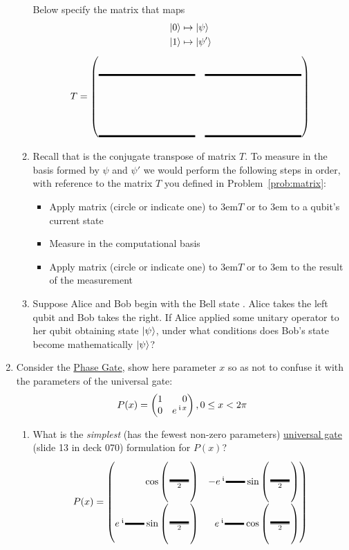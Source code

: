 \documentclass[12pt]{article}
\begin{document}
\begin{enumerate}
\begin{enumerate}[label=\theenumi.\arabic*]
Below specify the matrix that maps
\begin{align*}
    \ket{0} &\mapsto \ket{\psi} \\
    \ket{1} &\mapsto \ket{\psi'}
\end{align*}
\[
T = \begin{pmatrix*}[r]
\Blank[10em]{} & \Blank[10em]{} \\[4em]
\Blank[10em]{} & \Blank[10em]{}
\end{pmatrix*}
\]
\item{} Recall that  is the conjugate transpose of matrix $T$.  To measure in the basis formed by $\psi$ and $\psi'$ we would perform the following steps in order, with reference to the matrix $T$ you defined in Problem~\ref{prob:matrix}:
\begin{itemize}
    \item Apply matrix (circle or indicate one) \hbox to 3em{\hss$T$\hss} or \hbox to 3em{\hss{}\hss}  to a qubit's current state
    \item Measure in the computational basis
    \item Apply matrix (circle or indicate one) \hbox to 3em{\hss$T$\hss} or \hbox to 3em{\hss{}\hss}  to the result of the measurement
\end{itemize}
\item{} Suppose Alice and Bob begin with the Bell state . Alice takes the left qubit and Bob takes the right. If Alice applied some unitary operator  to her qubit obtaining state $\ket{\psi_{}}$, under what conditions does Bob's state become mathematically $\ket{\psi_{}}$?
\LeaveSpace{}
\end{enumerate}
\item\label{prob:phasegate} Consider the \href{https://docs.quantum.ibm.com/api/qiskit/qiskit.circuit.library.PhaseGate}{Phase Gate}, show here parameter $x$ so as not to confuse it with the parameters of the universal  gate:
\[
P(x) = \SQBG{\relax}{1}{0}{0}{\ExpPhase{x}}, 0\leq x < 2\pi
\]
\begin{enumerate}[label=\theenumi.\arabic*]
  \item{} What is the \emph{simplest} (has the fewest non-zero parameters) \href{https://docs.quantum.ibm.com/api/qiskit/qiskit.circuit.library.U3Gate}{universal gate} (slide 13 in deck 070) formulation for $P(x)$?
  \[
  P(x) = \SQBG{\relax}{\cos{\left(\frac{\Blank[2em]}{2}\right)}}{-\ExpPhase{\Blank[2em]}\sin{\left(\frac{\Blank[2em]}{2}\right)}}{\ExpPhase{\Blank[2em]}\sin{\left(\frac{\Blank[2em]}{2}\right)}}{\ExpPhase{\Blank[2em]}\cos{\left(\frac{\Blank[2em]}{2}\right)}}
\]
\end{enumerate}
\end{enumerate}
\end{document}
